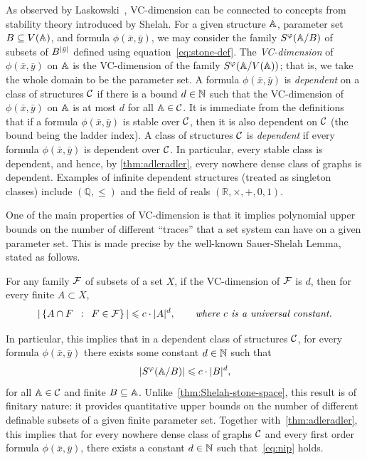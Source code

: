 As observed by Laskowski~\cite{laskowski1992vapnik}, VC-dimension can be connected to concepts from stability theory introduced by Shelah.
For a given structure $\str A$, parameter set $B\subseteq V(\str A)$, and formula $\phi(\bar x,\bar y)$,
we may consider the family $S^\phi(\str A/B)$ of subsets of $B^{|\tup y|}$ defined using equation~\eqref{eq:stone-def}.
The \emph{VC-dimension} of $\phi(\bar x,\bar y)$ on $\str A$ is the VC-dimension of the family $S^\phi(\str A/V(\str A))$; that is, we take the whole domain to be the parameter set. 
A formula $\phi(\bar x,\bar y)$ is \emph{dependent} on a class of structures $\cal C$
if there is a bound $d\in\N$ such that the VC-dimension of $\phi(\bar x,\bar y)$ on $\str A$ is at most $d$ for all $\str A\in\cal C$.
It is immediate from the definitions  that if a formula $\phi(\bar x,\bar y)$ is stable over $\cal C$, then it is also dependent on $\cal C$ (the bound being the ladder index). 
A class of structures  $\cal C$ is {\em{dependent}} if every formula $\phi(\bar x,\bar y)$ is dependent over $\cal C$. 
In particular, every stable class is dependent, and hence, by \cref{thm:adleradler}, every nowhere dense class of graphs is dependent.
Examples of infinite dependent structures (treated as singleton classes) include 
$(\mathbb Q,\le )$ and the field of reals $(\mathbb R,\times,+,0,1)$. 

One of the main properties of VC-dimension is that it implies polynomial upper bounds on the number of different ``traces'' that a set system can have on a given parameter set.
This is made precise by the well-known Sauer-Shelah Lemma, stated as follows.
\begin{theorem}\label{thm:sauer-shelah}
  For any family $\FFF$ of subsets of a set $X$, if the VC-dimension of $\FFF$ is $d$,
  then for every finite $A\subset X$,
$$|\setof{A\cap F}{F\in {\cal F}}|\le c\cdot |A|^d,  
\qquad\textit{where $c$ is a universal constant.}$$
\end{theorem}
In particular, this implies that 
in a dependent class of structures $\cal C$, 
for every formula $\phi(\bar x,\bar y)$
there exists some constant $d\in \N$
such that
\begin{equation}\label{eq:nip}
|S^\phi(\str A/B)|\le c\cdot |B|^d,	
\end{equation}
for all $\str A\in\cal C$ and finite $B\subset \str A$.
Unlike~\cref{thm:Shelah-stone-space}, this result 
is of finitary nature: it provides quantitative upper bounds on the number of different definable subsets of a given finite parameter set. 
Together with~\cref{thm:adleradler}, this implies that for every nowhere dense class of graphs $\cal C$
and every first order formula $\phi(\bar x,\bar y)$,
there exists a constant $d\in\N$ such that~\eqref{eq:nip} holds. 

